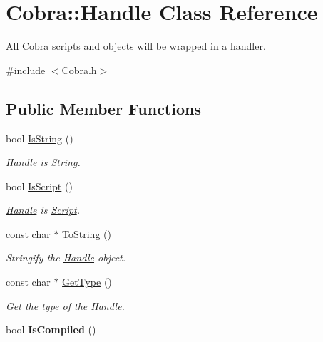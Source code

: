 \hypertarget{class_cobra_1_1_handle}{\section{Cobra\+:\+:Handle Class Reference}
\label{class_cobra_1_1_handle}
}


All \hyperlink{namespace_cobra}{Cobra} scripts and objects will be wrapped in a handler.  




{\ttfamily \#include $<$Cobra.\+h$>$}

\subsection*{Public Member Functions}
\begin{DoxyCompactItemize}
\item 
bool \hyperlink{class_cobra_1_1_handle_a1cd39727327efaaea04597acae87eca7}{Is\+String} ()
\begin{DoxyCompactList}\small\item\em \hyperlink{class_cobra_1_1_handle}{Handle} is \hyperlink{class_cobra_1_1_string}{String}. \end{DoxyCompactList}\item 
bool \hyperlink{class_cobra_1_1_handle_a4e641103844a622cec39b8e53f056112}{Is\+Script} ()
\begin{DoxyCompactList}\small\item\em \hyperlink{class_cobra_1_1_handle}{Handle} is \hyperlink{class_cobra_1_1_script}{Script}. \end{DoxyCompactList}\item 
const char $\ast$ \hyperlink{class_cobra_1_1_handle_a1cc4baae13a1fbf6d5d101b5fc5b11d5}{To\+String} ()
\begin{DoxyCompactList}\small\item\em Stringify the \hyperlink{class_cobra_1_1_handle}{Handle} object. \end{DoxyCompactList}\item 
const char $\ast$ \hyperlink{class_cobra_1_1_handle_a638691042734265cab9b15668fd72fc8}{Get\+Type} ()
\begin{DoxyCompactList}\small\item\em Get the type of the \hyperlink{class_cobra_1_1_handle}{Handle}. \end{DoxyCompactList}\item 
\hypertarget{class_cobra_1_1_handle_a5a2d2f8ec9f5d379767d2fe14ecc3298}{bool {\bfseries Is\+Compiled} ()}\label{class_cobra_1_1_handle_a5a2d2f8ec9f5d379767d2fe14ecc3298}


\end{DoxyCompactItemize}
